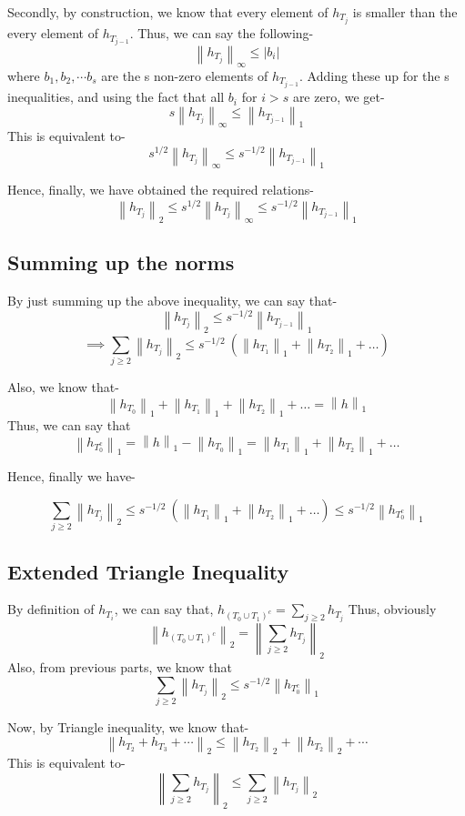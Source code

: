 \documentclass[a4paper,11pt]{article}
\numberwithin{definition}{section}
\numberwithin{mytheorem}{subsection}
\newcommand\norm[1]{\left\lVert#1\right\rVert}
\begin{document}
Secondly, by construction, we know that every element of $h_{T_j}$ is smaller than the every element of $h_{T_{j-1}}$. Thus, we can say the following-
$$\norm{h_{T_j}}_{\infty} \leq |b_i| $$
where $b_1, b_2, \cdots b_s$ are the s non-zero elements of $h_{T_{j-1}}$.
Adding these up for the s inequalities, and using the fact that all $b_i$ for $i>s$ are zero, we get-
$$s \norm{h_{T_j}}_\infty \leq \norm{h_{T_{j-1}}}_{1}$$
This is equivalent to-
$$s^{1/2} \norm{h_{T_j}}_\infty \leq  s^{-1/2} \norm{h_{T_{j-1}}}_{1}$$

Hence, finally, we have obtained the required relations-
$$\norm{h_{T_j}}_2 \leq s^{1/2} \norm{h_{T_j}}_\infty \leq  s^{-1/2} \norm{h_{T_{j-1}}}_1$$

\subsection{Summing up the norms}

By just summing up the above inequality, we can say that-
$$\norm{h_{T_j}}_2 \leq s^{-1/2} \norm{h_{T_{j-1}}}_1$$
$$\implies \sum \limits_{j \geq 2} \norm{h_{T_j}}_2 \leq s^{-1/2} \: (\norm{h_{T_1}}_1 + \norm{h_{T_2}}_1 + \ldots)$$

Also, we know that-
$$\norm{h_{T_0}}_1 + \norm{h_{T_1}}_1 + \norm{h_{T_2}}_1 + \ldots = \norm{h}_1$$
Thus, we can say that 
$$ \norm{h_{T_0^c}}_1 = \norm{h}_1 - \norm{h_{T_0}}_1 = \norm{h_{T_1}}_1 + \norm{h_{T_2}}_1 + \ldots $$ 

Hence, finally we have-

$$\sum \limits_{j \geq 2} \norm{h_{T_j}}_2 \leq s^{-1/2} ~(\norm{h_{T_1}}_1 + \norm{h_{T_2}}_1 + \ldots) \leq s^{-1/2}\norm{h_{T_0^c}}_1$$

\subsection{Extended Triangle Inequality}
\label{subsec1_5}

By definition of $h_{T_i}$, we can say that, $h_{(T_0 \cup T_1)^c} = \sum_{j \geq 2} h_{T_j}$
Thus, obviously
$$\norm{h_{(T_0 \cup T_1)^c}}_2 = \norm{\sum_{j \geq 2} h_{T_j}}_2$$
Also, from previous parts, we know that
$$\sum_{j \geq 2} \norm{h_{T_j}}_2 \leq s^{-1/2} \norm{h_{T_0^c}}_1$$

Now, by Triangle inequality, we know that-
$$\norm{h_{T_2} + h_{T_3} + \cdots}_2 \leq \norm{h_{T_2}}_2 + \norm{h_{T_2}}_2 + \cdots$$
This is equivalent to-
$$\norm{\sum_{j \geq 2} h_{T_j}}_2 \leq \sum_{j \geq 2} \norm{h_{T_j}}_2$$
\end{document}
